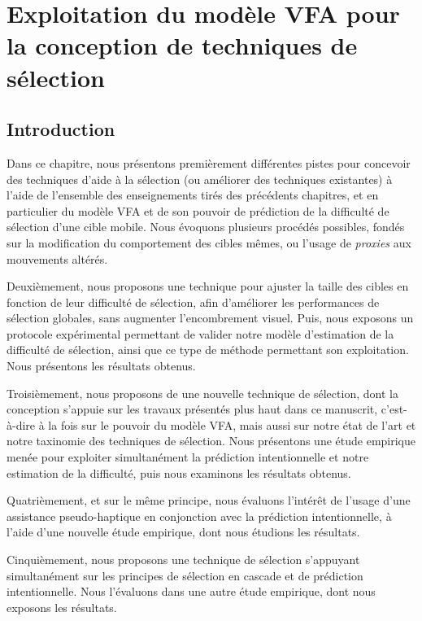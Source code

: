 
\chapter[Exploitation de VFA pour l'aide à la sélection]{Exploitation du modèle VFA pour la conception de techniques de sélection}
\minitoc
\label{chap5}
\clearpage

\section{Introduction}
	Dans ce chapitre, nous présentons premièrement différentes pistes pour concevoir des techniques d'aide à la sélection (ou améliorer des techniques existantes) à l'aide de l'ensemble des enseignements tirés des précédents chapitres, et en particulier du modèle VFA et de son pouvoir de prédiction de la difficulté de sélection d'une cible mobile. Nous évoquons plusieurs procédés possibles, fondés sur la modification du comportement des cibles mêmes, ou l'usage de \emph{proxies} aux mouvements altérés.
	
	Deuxièmement, nous proposons une technique pour ajuster la taille des cibles en fonction de leur difficulté de sélection, afin d'améliorer les performances de sélection globales, sans augmenter l'encombrement visuel. Puis, nous exposons un protocole expérimental permettant de valider notre modèle d'estimation de la difficulté de sélection, ainsi que ce type de méthode permettant son exploitation. Nous présentons les résultats obtenus.
	
	Troisièmement, nous proposons de une nouvelle technique de sélection, dont la conception s'appuie sur les travaux présentés plus haut dans ce manuscrit, c'est-à-dire à la fois sur le pouvoir du modèle VFA, mais aussi sur notre état de l'art et notre taxinomie des techniques de sélection. Nous présentons une étude empirique menée pour exploiter simultanément la prédiction intentionnelle et notre estimation de la difficulté, puis nous examinons les résultats obtenus.
	
	Quatrièmement, et sur le même principe, nous évaluons l'intérêt de l'usage d'une assistance pseudo-haptique en conjonction avec la prédiction intentionnelle, à l'aide d'une nouvelle étude empirique, dont nous étudions les résultats.
	
	Cinquièmement, nous proposons une technique de sélection s'appuyant simultanément sur les principes de sélection en cascade et de prédiction intentionnelle. Nous l'évaluons dans une autre étude empirique, dont nous exposons les résultats.
	
